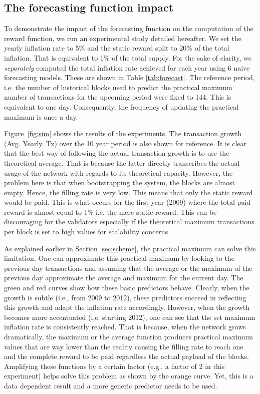 \documentclass[conference]{IEEEtran}
\begin{document}
\subsection{The forecasting function impact}
To demonstrate the impact of the forecasting function on the computation of the reward function, we run an experimental study detailed hereafter. We set the yearly inflation rate to 5\% and the static reward split to 20\% of the total inflation. That is equivalent to 1\% of the total supply. For the sake of clarity, we \emph{separately} computed the total inflation rate achieved for each year using 6 naive forecasting models. These are shown in Table \ref{tab:forecast}. The reference period, i.e. the number of historical blocks used to predict the practical maximum number of transactions for the upcoming period were fixed to 144. This is equivalent to one day. Consequently, the frequency of updating the practical maximum is once a day.

Figure~\ref{fig:sim} shows the results of the experiments. The transaction growth (Avg. Yearly. Tx) over the 10 year period is also shown for reference. It is clear that the best way of following the actual transaction growth is to use the theoretical average. That is because the latter directly transcribes the actual usage of the network with regards to its theoretical capacity. However, the problem here is that when bootstrapping the system, the blocks are almost empty. Hence, the filling rate is very low. This means that only the static reward would be paid. This is what occurs for the first year (2009) where the total paid reward is almost equal to 1\% i.e. the mere static reward. This can be discouraging for the validators especially if the theoretical maximum transactions per block is set to high values for scalability concerns.
					
As explained earlier in Section \ref{sec:scheme}, the practical maximum can solve this limitation. One can approximate this practical maximum by looking to the previous day transactions and assuming that the average or the maximum of the previous day approximate the average and maximum for the current day. The green and red curves show how these basic predictors behave. Clearly, when the growth is subtle (i.e., from 2009 to 2012), these predictors succeed in reflecting this growth and adapt the inflation rate accordingly. However, when the growth becomes more accentuated (i.e. starting 2012), one can see that the set maximum inflation rate is consistently reached. That is because, when the network grows dramatically, the maximum or the average function produces practical maximum values that are way lower than the reality causing the filling rate to reach one and the complete reward to be paid regardless the actual payload of the blocks. Amplifying these functions by a certain factor (e.g., a factor of 2 in this experiment) helps solve this problem as shown by the orange curve. Yet, this is a data dependent result and a more generic predictor needs to be used.
\end{document}
